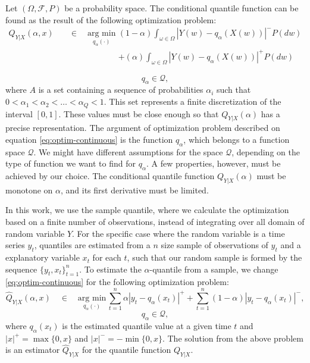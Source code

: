 Let $(\Omega, \mathcal{F}, P)$ be a probability space. The conditional quantile function can be found as the result of the following optimization problem:
\begin{eqnarray}
Q_{Y|X}(\alpha,x)\quad & \in\quad\underset{q_\alpha(\cdot)}{\text{arg min}}\, &
(1-\alpha)\int_{\omega \in \Omega}|Y(w)-q_\alpha(X(w))|^{-}P(dw) \label{eq:optim-continuous}
 \\ & & + (\alpha)\int_{\omega \in \Omega}|Y(w)-q_\alpha(X(w))|^{+}P(dw) \nonumber
\end{eqnarray}

\begin{equation}
  q_\alpha  \in \mathcal{Q},
\end{equation}
where $A$ is a set containing a sequence of probabilities  $\alpha_i$ such that $0 < \alpha_1 < \alpha_2 < \dots < \alpha_Q < 1$. This set represents a finite discretization of the interval $[0,1]$. These values must be close enough so that $Q_{Y|X}(\alpha)$ has a precise representation. The argument of optimization problem described on equation \ref{eq:optim-continuous} is the function $q_\alpha$, which belongs to a function space $\mathcal{Q}$. We might have different assumptions for the space $\mathcal{Q}$, depending on the type of function we want to find for $q_\alpha$. A few properties, however, must be achieved by our choice. The conditional quantile function $Q_{Y|X}(\alpha)$ must be monotone on $\alpha$, and its first derivative must be limited.

In this work, we use the sample quantile,  where we calculate the optimization based on a finite number of observations, instead of integrating over all domain of random variable $Y$. For the specific case where the random variable is a time series $y_t$, quantiles are estimated from a $n$ size sample of observations of $y_t$ and a explanatory variable $x_t$ for each $t$, such that our random sample is formed by the sequence $\{y_t,x_t \}_{t=1}^n$. To estimate the $\alpha$-quantile from a sample, we change \ref{eq:optim-continuous} for the following optimization problem:
\begin{equation}
\hat{Q}_{Y|X}(\alpha,x)\quad \in\quad\underset{q_\alpha(\cdot)}{\text{arg min}}\,\sum_{t=1}^{n}\alpha|y_{t}-q_\alpha(x_t)|^{+}+\sum_{t=1}^{n}(1-\alpha)|y_{t}-q_\alpha(x_t)|^{-},
\label{eq:linear-model}
\end{equation}
\begin{equation}
  q_\alpha  \in \mathcal{Q},
\end{equation}
where $q_\alpha(x_t)$ is the estimated quantile value at a given time $t$ and $|x|^+=\max\{0,x\}$ and $|x|^-=-\min\{0,x\}$. The solution from the above problem is an estimator $\hat{Q}_{Y|X}$ for the quantile function $Q_{Y|X}$.

